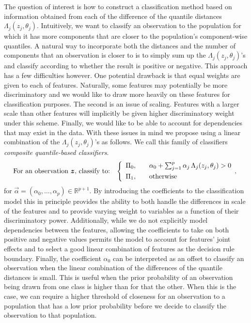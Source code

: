 The question of interest is how to construct a classification method based on
information obtained from each of the difference of the quantile distances
$\Lambda_j(z_j, \theta_j)$.  Intuitively, we want to classify an observation to
the population for which it has more components that are closer to the
population's component-wise quantiles.  A natural way to incorporate both the
distances and the number of components that an observation is closer to is to
simply sum up the $\Lambda_j(z_j, \theta_j)$'s and classify according to whether
the result is positive or negative.  This approach has a few difficulties
however.  One potential drawback is that equal weights are given to each of
features.  Naturally, some features may potentially be more discriminatory and
we would like to draw more heavily on these features for classification
purposes.  The second is an issue of scaling.  Features with a larger scale than
other features will implicitly be given higher discriminatory weight under this
scheme.  Finally, we would like to be able to account for dependencies that may
exist in the data.  With these issues in mind we propose using a linear
combination of the $\Lambda_j(z_j, \theta_j)$'s as follows.  We call this family
of classifiers \emph{composite quantile-based classifiers}.
\begin{equation}
  \label{eq:composite-classifier}
  \text{For an observation $\vec{z}$, classify to:} \hspace{3mm}
  \left\{
    \begin{array}{lll}
      \Pi_0, & & %
                 \alpha_0 + \sum_{j=1}^p \alpha_j \,
                 \Lambda_j (z_j, \theta_j) > 0 \\[1ex]
      \Pi_1, & & \text{otherwise}
    \end{array} ,
  \right.
\end{equation}
for $\vec{\alpha} = (\alpha_0, \dots, \alpha_p) \in \mathbb{R}^{p+1}$.  By
introducing the coefficients to the classification model this in principle
provides the ability to both handle the differences in scale of the features and
to provide varying weight to variables as a function of their discriminatory
power. Additionally, while we do not explicitly model dependencies between the
features, allowing the coefficients to take on both positive and negative values
permits the model to account for features' joint effects and to select a good
linear combination of features as the decision rule boundary.  Finally, the
coefficient $\alpha_0$ can be interpreted as an offset to classify an
observation when the linear combination of the differences of the quantile
distances is small.  This is useful when the prior probability of an observation
being drawn from one class is higher than for that the other.  When this is the
case, we can require a higher threshold of closeness for an observation to a
population that has a low prior probability before we decide to classify the
observation to that population.


